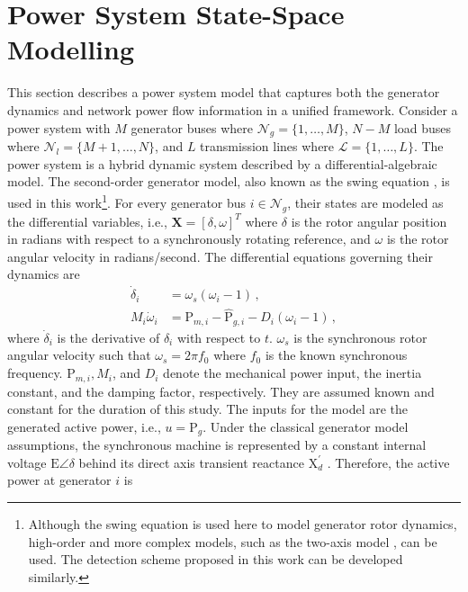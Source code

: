 \section{Power System State-Space Modelling}
\label{ch4:sec:power_model}
This section describes a power system model that captures both the generator dynamics and network power flow information in a unified framework. Consider a power system with $M$ generator buses where $\mathcal{N}_g = \{1, \dots, M\}$, $N-M$ load buses where $\mathcal{N}_l = \{M+1, \dots, N\}$, and $L$ transmission lines where $\mathcal{L} = \{1, \dots, L\}$. 
The power system is a hybrid dynamic system described by a differential-algebraic model. The second-order generator model, also known as the swing equation \cite{Kundur1994}, is used in this work\footnote{Although the swing equation is used here to model generator rotor dynamics, high-order and more complex models, such as the two-axis model \cite{sauer2017power}, can be used. The detection scheme proposed in this work can be developed similarly.}.
For every generator bus $i \in \mathcal{N}_g$, their states are modeled as the differential variables, i.e., $\boldsymbol{X}= [\delta, \omega]^T$ where $\delta$ is the rotor angular position in radians with respect to a synchronously rotating reference, and $\omega$ is the rotor angular velocity in radians/second. The differential equations governing their dynamics are
\begin{subequations}
\label{ch4:eqn:de_continuous}
\begin{align}
\dot{\delta}_{i} &=\omega_s\left(\omega_{i}-1\right) \,, \label{ch4:eqn:transition_function_delta}\\
M_i \dot{\omega}_{i} &=\text{P}_{m, i}-\hat{\text{P}}_{g, i}-D_i\left(\omega_{i}-1\right) \,, \label{ch4:eqn:transition_function_omega}
\end{align}
\end{subequations}
where $\dot{\delta}_{i}$ is the derivative of $\delta_i$ with respect to $t$. $\omega_s$ is the synchronous rotor angular velocity such that $\omega_s= 2 \pi f_{0}$ where $f_0$ is the known synchronous frequency. $\text{P}_{m,i}, M_i$, and $D_i$ denote the mechanical power input, the inertia constant, and the damping factor, respectively. They are assumed known and constant for the duration of this study. The inputs for the model are the generated active power, i.e., ${u}= \text{P}_{g}$. Under the classical generator model assumptions, the synchronous machine is represented by a constant internal voltage $\text{E}\angle\delta$ behind its direct axis transient reactance $\text{X}_{{d}}^{\prime}$ \cite{Kundur1994}. Therefore, the active power at generator $i$ is
